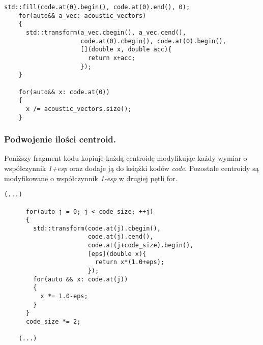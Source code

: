 \begin{lstlisting}[style=lst:cpp, caption=Funkcja \textit{lbg}\label{lst:lbgbody2} - obliczenie pierwszej centroidy]
    std::fill(code.at(0).begin(), code.at(0).end(), 0);
    for(auto&& a_vec: acoustic_vectors)
    {
      std::transform(a_vec.cbegin(), a_vec.cend(),
                     code.at(0).cbegin(), code.at(0).begin(),
                     [](double x, double acc){
                       return x+acc;
                     }); 
    }

    for(auto&& x: code.at(0))
    {
      x /= acoustic_vectors.size();
    }
\end{lstlisting}
\subsubsection{Podwojenie ilości centroid.}
Poniższy fragment kodu kopiuje każdą centroidę modyfikując każdy wymiar o współczynnik \textit{1+esp} oraz dodaje ją do książki kodów \textit{code}. Pozostałe centroidy są modyfikowane o współczynnik \textit{1-esp} w drugiej pętli for.
\begin{lstlisting}[style=lst:cpp, caption=Funkcja \textit{lbg}\label{lst:lbgbody3} - podwojenie ilości centroid]
    (...)

      for(auto j = 0; j < code_size; ++j)
      {
        std::transform(code.at(j).cbegin(),
                       code.at(j).cend(),
                       code.at(j+code_size).begin(),
                       [eps](double x){
                         return x*(1.0+eps); 
                       });
        for(auto && x: code.at(j))
        {
          x *= 1.0-eps;
        }
      }
      code_size *= 2;

    (...)
\end{lstlisting}
